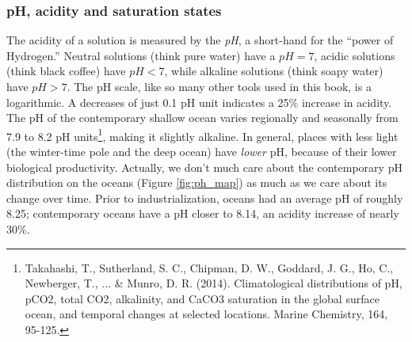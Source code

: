 \subsubsection{pH, acidity and saturation states}
The acidity of a solution is measured by the \emph{pH}, a short-hand for the ``power of Hydrogen.'' Neutral solutions (think pure water) have a $pH=7$, acidic solutions (think black coffee) have $pH<7$, while alkaline solutions (think soapy water) have $pH>7$. The pH scale, like so many other tools used in this book, is a logarithmic. A decreases of just 0.1 pH unit indicates a 25\% increase in acidity. The pH of the contemporary shallow ocean varies regionally and seasonally from 7.9 to 8.2 pH units\footnote{Takahashi, T., Sutherland, S. C., Chipman, D. W., Goddard, J. G., Ho, C., Newberger, T., ... \& Munro, D. R. (2014). Climatological distributions of pH, pCO2, total CO2, alkalinity, and CaCO3 saturation in the global surface ocean, and temporal changes at selected locations. Marine Chemistry, 164, 95-125.}, making it slightly alkaline. In general, places with less light (the winter-time pole and the deep ocean) have \emph{lower} pH, because of their lower biological productivity. Actually, we don't much care about the contemporary pH distribution on the oceans (Figure \ref{fig:ph_map}) as much as we care about its change over time. Prior to industrialization, oceans had an average pH of roughly 8.25; contemporary oceans have a pH closer to 8.14, an acidity increase of nearly 30\%. \\
